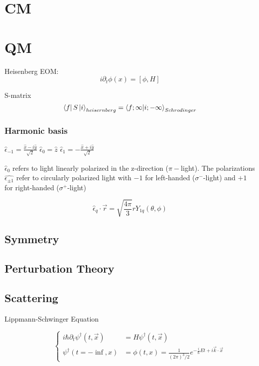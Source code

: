 \section{CM}


\section{QM}
Heisenberg EOM:
\begin{equation}
    \label{eqn:Heisenberg EOM}
    i\partial_t\phi(x) = [\phi, H]
\end{equation}

S-matrix
\begin{equation}
    \label{S-matrix}
    \bra{f}S\ket{i}_{heisernberg} = \bra{f;\infty}\ket{i;-\infty}_{Schrodinger}
\end{equation}

\subsubsection{Harmonic basis}
$\hat{\epsilon}_{-1} = \frac{\hat{x} - i\hat{y}}{\sqrt{2}}$
$\hat{\epsilon}_{0} = \hat{z}$
$\hat{\epsilon}_{1} = -\frac{\hat{x} + i\hat{y}}{\sqrt{2}}$

$\hat{\epsilon}_0$ refers to light linearly polarized in the z-direction
($\pi-$light). The polarizations $\hat{\epsilon_{\pm 1}}$ refer to 
circularly polarized light with $-1$ for left-handed ($\sigma^-$-light) 
and $+1$ for right-handed ($\sigma^+$-light)

\[
    \hat{\epsilon}_q \cdot \vec{r} = \sqrt{\frac{4\pi}{3}}rY_{1q}(\theta, \phi)
\]
\subsection{Symmetry}

\subsection{Perturbation Theory}

\subsection{Scattering}
\begin{description}
    \item [Lippmann-Schwinger Equation]
	\begin{equation}
	    \label{eqn:qm:LSEqn}
	    \left\{
		\begin{aligned}
		    i\hbar\partial_t\psi^\dag(t,\vec{x}) &= H\psi^\dag(t, \vec{x})   \\
		    \psi^\dag(t=-\inf, x) &= \phi(t,x) = \frac{1}{(2\pi)^3/2}e^{-\frac{i}{\hbar}Et + i\vec{k}\cdot\vec{x}} 
		\end{aligned}
		\right.
	\end{equation}
\end{description}

